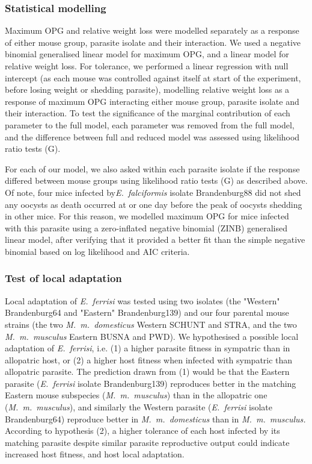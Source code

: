 \documentclass[12pt]{article}
\begin{document}
\subsubsection{Statistical modelling}

Maximum OPG and relative weight loss were modelled separately as a response of either mouse group, parasite isolate and their interaction. We used a negative binomial generalised linear model for maximum OPG, and a linear model for relative weight loss. For tolerance, we performed a linear regression with null intercept (as each mouse was controlled against itself at start of the experiment, before losing weight or shedding parasite), modelling relative weight loss as a response of maximum OPG interacting either mouse group, parasite isolate and their interaction. To test the significance of the marginal contribution of each parameter to the full model, each parameter was removed from the full model, and the difference between full and reduced model was assessed using likelihood ratio tests (G). \par

For each of our model, we also asked within each parasite isolate if the response differed between mouse groups using likelihood ratio tests (G) as described above. Of note, four mice infected by\textit{E.~falciformis} isolate Brandenburg88 did not shed any oocysts as death occurred at or one day before the peak of oocysts shedding in other mice. For this reason, we modelled maximum OPG for mice infected with this parasite using a zero-inflated negative binomial (ZINB) generalised linear model, after verifying that it provided a better fit than the simple negative binomial based on log likelihood and AIC criteria.\par

\subsubsection{Test of local adaptation}

Local adaptation of \textit{E.~ferrisi} was tested using two isolates (the "Western" Brandenburg64 and "Eastern" Brandenburg139) and our four parental mouse strains (the two \textit{M.~m.~domesticus} Western SCHUNT and STRA, and the two \textit{M.~m.~musculus }Eastern BUSNA and PWD). We hypothesised a possible local adaptation of \textit{E.~ferrisi}, i.e. (1) a higher parasite fitness in sympatric than in allopatric host, or (2) a higher host fitness when infected with sympatric than allopatric parasite. The prediction drawn from (1) would be that the Eastern parasite (\textit{E.~ferrisi} isolate Brandenburg139) reproduces better in the matching Eastern mouse subspecies (\textit{M.~m.~musculus}) than in the allopatric one (\textit{M.~m.~musculus}), and similarly the Western parasite (\textit{E.~ferrisi} isolate Brandenburg64) reproduce better in \textit{M.~m.~domesticus} than in \textit{M.~m.~musculus.} According to hypothesis (2), a higher tolerance of each host infected by its matching parasite despite similar parasite reproductive output could indicate increased host fitness, and host local adaptation.\par
\end{document}
